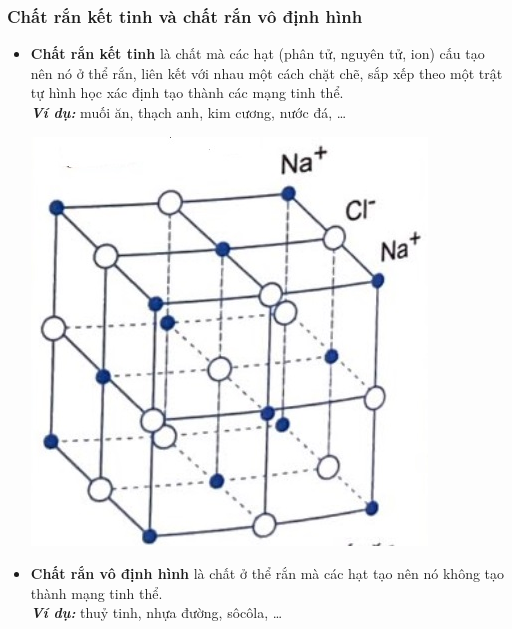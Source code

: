 \subsubsection{Chất rắn kết tinh và chất rắn vô định hình}
\begin{itemize}
	\item \textbf{Chất rắn kết tinh} là chất mà các hạt (phân tử, nguyên tử, ion) cấu tạo nên nó ở thể rắn, liên kết với nhau một cách chặt chẽ, sắp xếp theo một trật tự hình học xác định tạo thành các mạng tinh thể.\\
	\textit{\textbf{Ví dụ:}} muối ăn, thạch anh, kim cương, nước đá, \dots
	\begin{center}
		\includegraphics[width=0.2\linewidth]{../figs/VN12-Y24-PH-SYL-001-3}
	\end{center}
	\item \textbf{Chất rắn vô định hình} là chất ở thể rắn mà các hạt tạo nên nó không tạo thành mạng tinh thể.\\
	\textbf{\textit{Ví dụ:}} thuỷ tinh, nhựa đường, sôcôla, \dots
\end{itemize}
